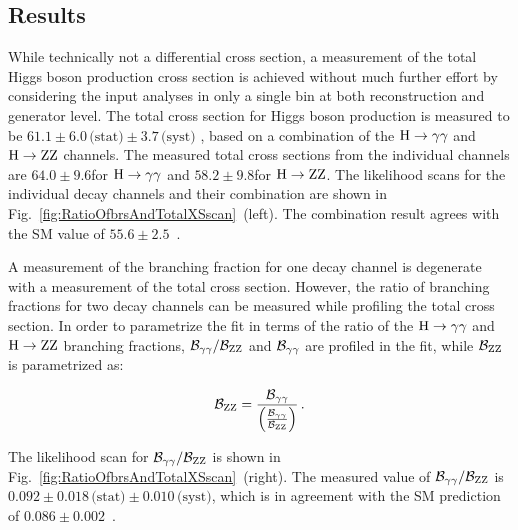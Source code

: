 \subsection{Results}
\label{sec:diffxs-results}

While technically not a differential cross section, a measurement of the total Higgs boson production cross section is achieved without much further effort by considering the input analyses in only a single bin at both reconstruction and generator level.
% 
The total cross section for Higgs boson production is measured to be
$61.1   \pm 6.0 \,\text{(stat)}   \pm 3.7 \,\text{(syst)}  $\pb
, based on a combination of the $\mathrm{H}\to\mathrm{\gamma}\mathrm{\gamma}$ and $\mathrm{H}\to\mathrm{Z}\mathrm{Z}$ channels.
% 
The measured total cross sections from the individual channels are $64.0\pm9.6$\pb for $\mathrm{H}\to\mathrm{\gamma}\mathrm{\gamma}$ and $58.2\pm9.8$\pb for $\mathrm{H}\to\mathrm{Z}\mathrm{Z}$.
% 
The likelihood scans for the individual decay channels and their combination are shown in Fig.~\ref{fig:RatioOfbrsAndTotalXSscan}~(left).
% 
The combination result agrees with the SM value of $55.6\pm2.5$\pb~\cite{deFlorian:2016spz}.


A measurement of the branching fraction for one decay channel is degenerate with a measurement of the total cross section.
% 
However, the ratio of branching fractions for two decay channels can be measured while profiling the total cross section.
% 
In order to parametrize the fit in terms of the ratio of the $\mathrm{H}\to\mathrm{\gamma}\mathrm{\gamma}$ and $\mathrm{H}\to\mathrm{Z}\mathrm{Z}$ branching fractions, $\mathcal{B}_{\mathrm{\gamma}\mathrm{\gamma}}/\mathcal{B}_{\mathrm{Z}\mathrm{Z}}$ and $\mathcal{B}_{\mathrm{\gamma}\mathrm{\gamma}}$ are profiled in the fit, while $\mathcal{B}_{\mathrm{Z}\mathrm{Z}}$ is parametrized as:
% 
\begin{linenomath*}
\begin{equation}
\mathcal{B}_{\mathrm{Z}\mathrm{Z}} = \frac{\mathcal{B}_{\mathrm{\gamma}\mathrm{\gamma}}}{ \left( \frac{\mathcal{B}_{\mathrm{\gamma}\mathrm{\gamma}}}{\mathcal{B}_{\mathrm{Z}\mathrm{Z}}} \right) }
\,.
\end{equation}
\end{linenomath*}
% 
The likelihood scan for $\mathcal{B}_{\mathrm{\gamma}\mathrm{\gamma}}/\mathcal{B}_{\mathrm{Z}\mathrm{Z}}$ is shown in Fig.~\ref{fig:RatioOfbrsAndTotalXSscan}~(right).
% 
The measured value of $\mathcal{B}_{\mathrm{\gamma}\mathrm{\gamma}}/\mathcal{B}_{\mathrm{Z}\mathrm{Z}}$ is
$0.092   \pm 0.018 \,\text{(stat)}   \pm 0.010 \,\text{(syst)}  $,
which is in agreement with the SM prediction of $0.086 \pm 0.002$~\cite{deFlorian:2016spz}.


